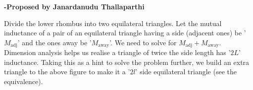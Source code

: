 \documentclass[11pt,a4paper]{scrartcl}
\begin{document}
\begin{flushright}
\textbf{\Large{-Proposed by Janardanudu Thallaparthi}}
\end{flushright}
\begin{solution}


Divide the lower rhombus into two equilateral triangles. Let the mutual inductance of a pair of an equilateral triangle having a side (adjacent ones) be '$M_{\text{adj}}$' and the ones away be '$M_{\text{away}}$'. We need to solve for $M_{\text{adj}}+M_{\text{away}}$. Dimension analysis helps us realise a triangle of twice the side length has '$2L$' inductance. Taking this as a hint to solve the problem further, we build an extra triangle to the above figure to make it a '$2l$' side equilateral triangle (see the equivalence). \\
\begin{center}
    


\begin{tikzpicture}[x=0.75pt,y=0.75pt,yscale=-1,xscale=1]


\end{tikzpicture}
\end{center}
\end{solution}
\end{document}
